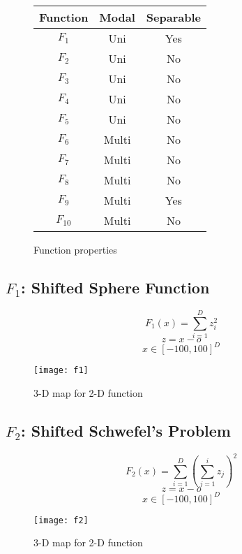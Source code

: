 \begin{figure}[H]
  \centering
  \begin{center}
    \begin{tabular}{ | c | c | c | }
      \hline
      Function & Modal & Separable \\ \hline
      $F_{1}$ & Uni & Yes \\ \hline
      $F_{2}$ & Uni & No \\ \hline
      $F_{3}$ & Uni & No \\ \hline
      $F_{4}$ & Uni & No \\ \hline
      $F_{5}$ & Uni & No \\ \hline
      $F_{6}$ & Multi & No \\ \hline
      $F_{7}$ & Multi & No \\ \hline
      $F_{8}$ & Multi & No \\ \hline
      $F_{9}$ & Multi & Yes \\ \hline
      $F_{10}$ & Multi & No \\

      \hline
    \end{tabular}
  \end{center}
  \caption{Function properties}
  \label{math:prop}
\end{figure}

\subsection{$F_1$: Shifted Sphere Function}

\begin{equation}
  F_1(x)=\sum_{i=1}^{D}{z_i^2}
\end{equation}
\[ z=x-o \]
\[ x \in [-100,100]^D \]

\begin{figure}[H]
  \centering
  \texttt{[image: f1]}
  \caption{3-D map for 2-D function}
  \label{f1}
\end{figure}

\subsection{$F_2$: Shifted Schwefel’s Problem}

\begin{equation}
  F_2(x)=\sum_{i=1}^{D}{(\sum_{j=1}^{i}{z_j})^2}
\end{equation}
\[ z=x-o \]
\[ x \in [-100,100]^D \]

\begin{figure}[H]
  \centering
  \texttt{[image: f2]}
  \caption{3-D map for 2-D function}
  \label{f2}
\end{figure}

